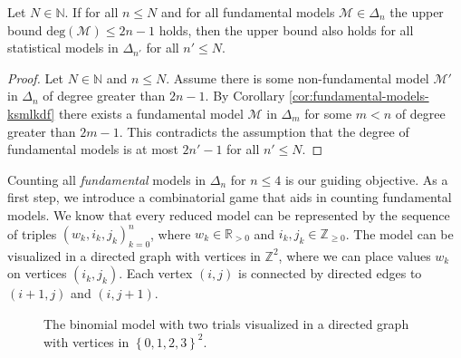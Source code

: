 \begin{theorem}\label{thm:degree-fundamental-models-reduced}
    Let \(N \in \mathbb{N} \). If for all $n \leq N$ and for all fundamental models \( \mathcal{M} \in \Delta_n\) the upper bound \( \mathrm{deg}(\mathcal{M}) \leq 2n - 1\)  holds, then the upper bound also holds for all statistical models in \( \Delta_{n'} \) for all \( n' \leq N \).    
\end{theorem}

\begin{proof}
    Let $N \in \mathbb{N}$ and $n \leq N$.
    Assume there is some non-fundamental model $\mathcal{M}'$ in $\Delta_n$ of degree greater than $2n - 1$. By Corollary \ref{cor:fundamental-models-ksmlkdf} there exists a fundamental model $\mathcal{M}$ in $\Delta_m$ for some $m < n$ of degree greater than $2m - 1$. This contradicts the assumption that the degree of fundamental models is at most $2n' - 1$ for all $n' \leq N$.
\end{proof}

Counting all \emph{fundamental} models in $\Delta_n$ for $n \leq 4$ is our guiding objective. As a first step, we introduce a combinatorial game that aids in counting fundamental models. We know that every reduced model can be represented by the sequence of triples $(w_k, i_k, j_k)^{n}_{k=0}$, where $w_k \in \mathbb{R}_{>0}$ and $i_k, j_k \in \mathbb{Z}_{\geq 0}$. The model can be visualized in a directed graph with vertices in $\mathbb{Z}^2$, where we can place values $w_k$ on vertices $(i_k, j_k)$. Each vertex $(i,j)$ is connected by directed edges to $(i+1, j)$ and $(i, j+1)$. 

\begin{figure}\label{fig:binom-discrete-model-visual}
    \centering
    \caption{The binomial model with two trials visualized in a directed graph with vertices in $\left\{0,1,2,3 \right\}^2$.}
\end{figure}


